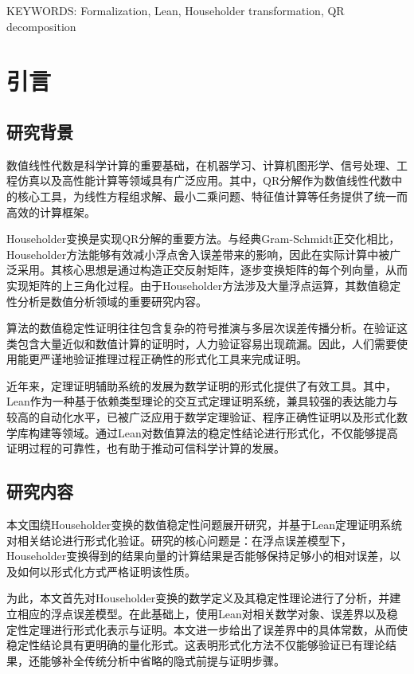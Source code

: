 ﻿\documentclass[UTF8,a4paper,openany]{ctexbook}
\theoremstyle{qrplain}
\begin{document}
\vspace{\baselineskip}

KEYWORDS: Formalization, Lean, Householder transformation, QR decomposition

\newpage
\tableofcontents

\clearpage
{}

\chapter{引言}

\section{研究背景}

数值线性代数是科学计算的重要基础，在机器学习、计算机图形学、信号处理、工程仿真以及高性能计算等领域具有广泛应用。其中，QR分解作为数值线性代数中的核心工具，为线性方程组求解、最小二乘问题、特征值计算等任务提供了统一而高效的计算框架。

Householder变换是实现QR分解的重要方法。与经典Gram-Schmidt正交化相比，Householder方法能够有效减小浮点舍入误差带来的影响，因此在实际计算中被广泛采用。其核心思想是通过构造正交反射矩阵，逐步变换矩阵的每个列向量，从而实现矩阵的上三角化过程。由于Householder方法涉及大量浮点运算，其数值稳定性分析是数值分析领域的重要研究内容。

算法的数值稳定性证明往往包含复杂的符号推演与多层次误差传播分析。在验证这类包含大量近似和数值计算的证明时，人力验证容易出现疏漏。因此，人们需要使用能更严谨地验证推理过程正确性的形式化工具来完成证明。

近年来，定理证明辅助系统的发展为数学证明的形式化提供了有效工具。其中，Lean作为一种基于依赖类型理论的交互式定理证明系统，兼具较强的表达能力与较高的自动化水平，已被广泛应用于数学定理验证、程序正确性证明以及形式化数学库构建等领域。通过Lean对数值算法的稳定性结论进行形式化，不仅能够提高证明过程的可靠性，也有助于推动可信科学计算的发展。

\section{研究内容}

本文围绕Householder变换的数值稳定性问题展开研究，并基于Lean定理证明系统对相关结论进行形式化验证。研究的核心问题是：在浮点误差模型下，Householder变换得到的结果向量的计算结果是否能够保持足够小的相对误差，以及如何以形式化方式严格证明该性质。

为此，本文首先对Householder变换的数学定义及其稳定性理论进行了分析，并建立相应的浮点误差模型。在此基础上，使用Lean对相关数学对象、误差界以及稳定性定理进行形式化表示与证明。本文进一步给出了误差界中的具体常数，从而使稳定性结论具有更明确的量化形式。这表明形式化方法不仅能够验证已有理论结果，还能够补全传统分析中省略的隐式前提与证明步骤。
\end{document}
